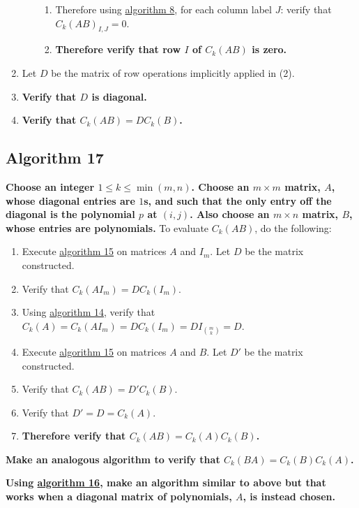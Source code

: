 \documentclass[twocolumn]{article}
\begin{document}
\begin{enumerate}
\begin{enumerate}
\begin{enumerate}
						\item Therefore using \hyperref[sec:algorithm 8]{algorithm 8}, for each column label $J$: verify that ${C_k(AB)}_{I,J}=0$.
						\item \textbf{Therefore verify that row $I$ of $C_k(AB)$ is zero.}
					\end{enumerate}
				\end{enumerate}
				\item Let $D$ be the matrix of row operations implicitly applied in (2).
				\item \textbf{Verify that $D$ is diagonal.}
				\item \textbf{Verify that $C_k(AB)=DC_k(B)$.}
			\end{enumerate}
		\subsection{Algorithm 17}\label{sec:algorithm 17}
			\textbf{Choose an integer $1\le k\le\min(m,n)$. Choose an $m\times m$ matrix, $A$, whose diagonal entries are $1$s, and such that the only entry off the diagonal is the polynomial $p$ at $(i,j)$. Also choose an $m\times n$ matrix, $B$, whose entries are polynomials.} To evaluate $C_k(AB)$, do the following:
			\begin{enumerate}
				\item Execute \hyperref[sec:algorithm 15]{algorithm 15} on matrices $A$ and $I_m$. Let $D$ be the matrix constructed.
				\item Verify that $C_k(AI_m)=DC_k(I_m)$.
				\item Using \hyperref[sec:algorithm 14]{algorithm 14}, verify that $C_k(A)=C_k(AI_m)=DC_k(I_m)=DI_{\binom{m}{k}}=D$.
				\item Execute \hyperref[sec:algorithm 15]{algorithm 15} on matrices $A$ and $B$. Let $D'$ be the matrix constructed.
				\item Verify that $C_k(AB)=D'C_k(B)$.
				\item Verify that $D'=D=C_k(A)$.
				\item \textbf{Therefore verify that $C_k(AB)=C_k(A)C_k(B)$.}
			\end{enumerate}
			\textbf{Make an analogous algorithm to verify that $C_k(BA)=C_k(B)C_k(A)$.}
			
			\textbf{Using \hyperref[sec:algorithm 16]{algorithm 16}, make an algorithm similar to above but that works when a diagonal matrix of polynomials, $A$, is instead chosen.}
\end{document}
